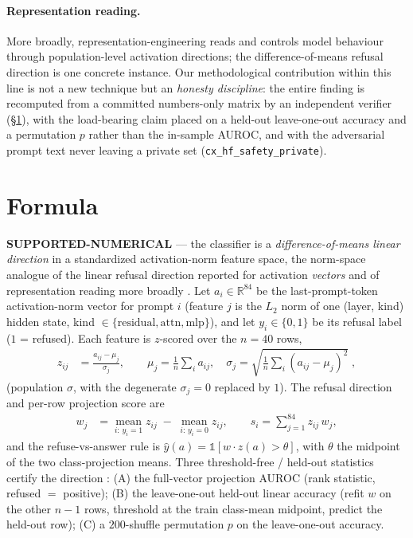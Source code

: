 \documentclass[11pt,a4paper]{article}
\begin{document}
\paragraph{Representation reading.} More broadly, representation-engineering
\citep{zou2023representation} reads and controls model behaviour through
population-level activation directions; the difference-of-means refusal
direction is one concrete instance. Our methodological contribution within this
line is not a new technique but an \emph{honesty discipline}: the entire finding
is recomputed from a committed numbers-only matrix by an independent verifier
(\S\ref{sec:formula}), with the load-bearing claim placed on a held-out
leave-one-out accuracy and a permutation $p$ rather than the in-sample AUROC,
and with the adversarial prompt text never leaving a private set
(\texttt{cx\_hf\_safety\_private}).

\section{Formula}
\label{sec:formula}
\textcolor{green!50!black}{\textbf{SUPPORTED-NUMERICAL}} --- the classifier is a
\emph{difference-of-means linear direction} in a standardized activation-norm
feature space, the norm-space analogue of the linear refusal direction reported
for activation \emph{vectors} \citep{arditi2024refusal} and of representation
reading more broadly \citep{zou2023representation}. Let \(a_i \in
\mathbb{R}^{84}\) be the last-prompt-token activation-norm vector for prompt
\(i\) (feature \(j\) is the \(L_2\) norm of one (layer, kind)
hidden state, kind \(\in\{\text{residual},\text{attn},\text{mlp}\}\)), and let
\(y_i\in\{0,1\}\) be its refusal label (\(1\) = refused). Each feature is
\(z\)-scored over the \(n{=}40\) rows,
\begin{align}
  z_{ij} &= \frac{a_{ij}-\mu_j}{\sigma_j}, \qquad
  \mu_j=\tfrac{1}{n}\textstyle\sum_i a_{ij}, \quad
  \sigma_j=\sqrt{\tfrac{1}{n}\textstyle\sum_i (a_{ij}-\mu_j)^2}\;,
\end{align}
(population \(\sigma\), with the degenerate \(\sigma_j{=}0\) replaced by \(1\)).
The refusal direction and per-row projection score are
\begin{align}
  w_j &= \operatorname*{mean}_{i:\,y_i=1} z_{ij} \;-\;
         \operatorname*{mean}_{i:\,y_i=0} z_{ij}, \qquad
  s_i = \sum_{j=1}^{84} z_{ij}\,w_j,
\end{align}
and the refuse-vs-answer rule is \(\hat{y}(a) = \mathbb{1}\!\left[w\cdot z(a) >
\theta\right]\), with \(\theta\) the midpoint of the two class-projection means.
Three threshold-free / held-out statistics certify the direction
\citep{fawcett2006roc,good2000permutation}: (A) the full-vector projection AUROC
(rank statistic, refused \(=\) positive); (B) the leave-one-out held-out linear
accuracy (refit \(w\) on the other \(n{-}1\) rows, threshold at the train
class-mean midpoint, predict the held-out row); (C) a \(200\)-shuffle
permutation \(p\) on the leave-one-out accuracy.
\end{document}
